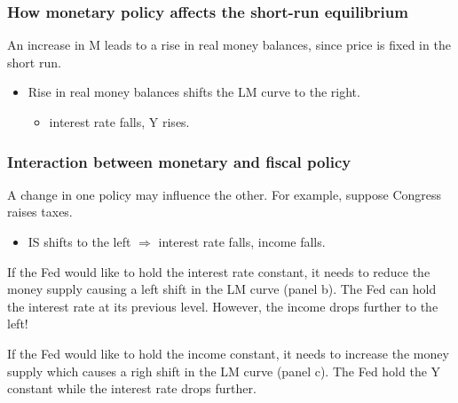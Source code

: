 \documentclass[10pt]{article}
\begin{document}
\subsubsection{How monetary policy affects the short-run equilibrium}

An increase in M leads to a rise in real money balances, since price is fixed in the 
short run.
\begin{itemize}
\item Rise in real money balances shifts the LM curve to the right.
		\begin{itemize}
		\item interest rate falls, Y rises.
		\end{itemize}
\end{itemize}





\subsubsection{Interaction between monetary and fiscal policy}

A change in one policy may influence the other. For example, suppose Congress raises
taxes.
\begin{itemize}
\item IS shifts to the left $ \Longrightarrow $ interest rate falls, income falls.
\end{itemize}


If the Fed would like to hold the interest rate constant, it needs to reduce the  money
supply causing a left shift in the LM curve (panel b). 
The Fed can hold the interest rate at its previous level. However, the income drops 
further to the left!



If the Fed would like to hold the income constant, it needs to increase the money supply
which causes a righ shift in the LM curve (panel c).
The Fed hold the Y constant while the interest rate drops further.
\end{document}
